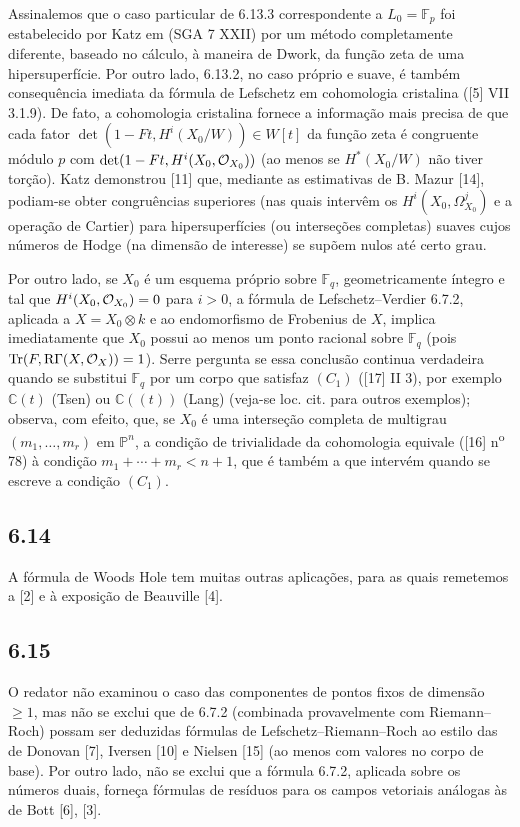 Assinalemos que o caso particular de 6.13.3 correspondente a $L_0=\mathbb F_p$ foi estabelecido por Katz em (SGA 7 XXII) por um método completamente diferente, baseado no cálculo, à maneira de Dwork, da função zeta de uma hipersuperfície. Por outro lado, 6.13.2, no caso próprio e suave, é também consequência imediata da fórmula de Lefschetz em cohomologia cristalina ([5] VII 3.1.9). De fato, a cohomologia cristalina fornece a informação mais precisa de que cada fator $\det(1-Ft,H^i(X_0/W))\in W[t]$ da função zeta é congruente módulo $p$ com $\det(1-Ft,H^i(X_0,\mathcal{O}_{X_0}))$ (ao menos se $H^*(X_0/W)$ não tiver torção). Katz demonstrou [11] que, mediante as estimativas de B. Mazur [14], podiam-se obter congruências superiores (nas quais intervêm os $H^i(X_0,\Omega^j_{X_0})$ e a operação de Cartier) para hipersuperfícies (ou interseções completas) suaves cujos números de Hodge (na dimensão de interesse) se supõem nulos até certo grau.

Por outro lado, se $X_0$ é um esquema próprio sobre $\mathbb F_q$, geometricamente íntegro e tal que $H^i(X_0,\mathcal{O}_{X_0})=0$ para $i>0$, a fórmula de Lefschetz--Verdier 6.7.2, aplicada a $X=X_0\otimes k$ e ao endomorfismo de Frobenius de $X$, implica imediatamente que $X_0$ possui ao menos um ponto racional sobre $\mathbb F_q$ (pois $\operatorname{Tr}(F,\mathrm{R}\Gamma(X,\mathcal{O}_X))=1$). Serre pergunta se essa conclusão continua verdadeira quando se substitui $\mathbb F_q$ por um corpo que satisfaz $(C_1)$ ([17] II 3), por exemplo $\mathbb C(t)$ (Tsen) ou $\mathbb C((t))$ (Lang) (veja-se loc. cit. para outros exemplos); observa, com efeito, que, se $X_0$ é uma interseção completa de multigrau $(m_1,\ldots,m_r)$ em $\mathbb P^n$, a condição de trivialidade da cohomologia equivale ([16] n\textsuperscript{o} 78) à condição $m_1+\cdots+m_r<n+1$, que é também a que intervém quando se escreve a condição $(C_1)$.

\subsection*{6.14}
A fórmula de Woods Hole tem muitas outras aplicações, para as quais remetemos a [2] e à exposição de Beauville [4].


\subsection*{6.15}

O redator não examinou o caso das componentes de pontos fixos de dimensão $\geq1$, mas não se exclui que de 6.7.2 (combinada provavelmente com Riemann--Roch) possam ser deduzidas fórmulas de Lefschetz--Riemann--Roch ao estilo das de Donovan [7], Iversen [10] e Nielsen [15] (ao menos com valores no corpo de base). Por outro lado, não se exclui que a fórmula 6.7.2, aplicada sobre os números duais, forneça fórmulas de resíduos para os campos vetoriais análogas às de Bott [6], [3].
